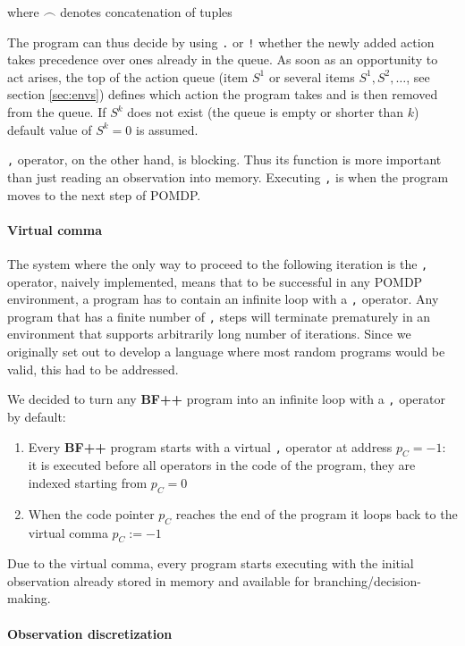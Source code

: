 where $\frown$ denotes concatenation of tuples

The program can thus decide by using \texttt{.} or \texttt{!} whether the newly added action takes precedence over ones already in the queue.
As soon as an opportunity to act arises, the top of the action queue (item $S^1$ or several items $S^1,S^2,\dots$, see section \ref{sec:envs}) defines which action the program takes and is then removed from the queue. 
If $S^k$ does not exist (the queue is empty or shorter than $k$) default value of $S^k=0$ is assumed.

\texttt{,} operator, on the other hand, is blocking. 
Thus its function is more important than just reading an observation into memory.
Executing \texttt{,} is when the program moves to the next step of POMDP.

\paragraph{Virtual comma}
\label{sec:virtualcomma}


The system where the only way to proceed to the following iteration is the \texttt{,} operator, naively implemented, means that to be successful in any POMDP environment, a program has to contain an infinite loop with a \texttt{,} operator.
Any program that has a finite number of \texttt{,} steps will terminate prematurely in an environment that supports arbitrarily long number of iterations.
Since we originally set out to develop a language where most random programs would be valid, this had to be addressed.

We decided to turn any \textbf{BF++} program into an infinite loop with a \texttt{,} operator by default:
\begin{enumerate}
    \item Every \textbf{BF++} program starts with a virtual \texttt{,} operator at address $p_C = -1$: it is executed before all operators in the code of the program, they are indexed starting from $p_C = 0$
    \item When the code pointer $p_C$ reaches the end of the program it loops back to the virtual comma $p_C := -1$
\end{enumerate}

Due to the virtual comma, every program starts executing with the initial observation already stored in memory and available for branching/decision-making.

\paragraph{Observation discretization}
\label{sec:observe}

